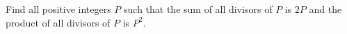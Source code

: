 Find all positive integers $P$ such that the sum of all divisors of $P$ is $2P$ and the product of all divisors of $P$ is $P^2$.
